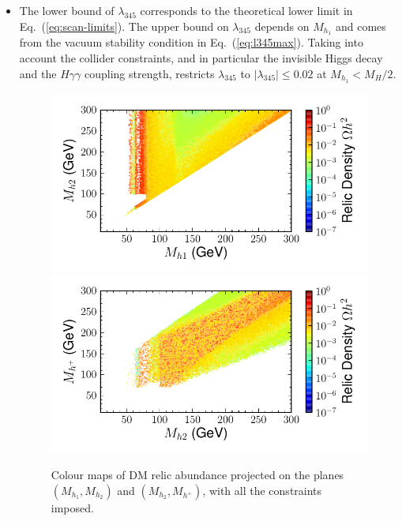\documentclass[12pt,a4paper]{article}
\begin{document}
\begin{itemize}

\item The lower bound of $\lambda_{345}$ corresponds to the theoretical lower limit in Eq.~(\ref{eq:scan-limits}).
The upper bound on $\lambda_{345}$ depends on $M_{h_1}$ and comes from 
the vacuum stability condition in Eq.~(\ref{eq:l345max}). 
Taking into account the collider constraints, and in particular the invisible Higgs decay
and the $H\gamma\gamma$ coupling strength, restricts $\lambda_{345}$
to $|\lambda_{345}|\leq 0.02$ at $M_{h_1}<M_H/2$.

\begin{figure}[tbh]
\begin{center}
\includegraphics[trim={0.3cm 0  2.6cm 0.5cm},clip,height=0.26\textheight]{Mh1_Mh2_Omega_small_new-cut12345678_z.pdf}%
\includegraphics[trim={0.3cm 0   0    0.5cm },clip,height=0.26\textheight]{Mhc_Mh2_Omega_small_new-cut12345678_z.pdf}
\caption{Colour maps of DM relic abundance projected on the planes $(M_{h_1}, M_{h_2})$ and $(M_{h_2}, M_{h^+})$, with all the constraints imposed.\label{fig:scan-masses}} 
\end{center}
\end{figure}




\end{itemize}
\end{document}
